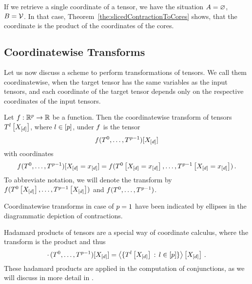If we retrieve a single coordinate of a tensor, we have the situation $A=\varnothing$, $B=\mathcal{V}$.
In that case, Theorem~\ref{the:slicedContractionToCores} shows, that the coordinate is the product of the coordinates of the cores. %

\subsection{Coordinatewise Transforms}

Let us now discuss a scheme to perform transformations of tensors.
We call them coordinatewise, when the target tensor has the same variables as the input tensors, and each coordinate of the target tensor depends only on the respective coordinates of the input tensors. %

\begin{definition}
    \label{def:coordinateCalculus}
    Let $f: \mathbb{R}^{p} \rightarrow \mathbb{R}$ be a function.
    Then the coordinatewise transform of tensors $T^{l}\left[X_{[d]}\right]$, where $l\in[p]$, under $f$ is the tensor
    \[ f(T^{0},\ldots,T^{p-1})[X_{[d]}] \]
    with coordinates
    \[ f(T^{0},\ldots,T^{p-1})[X_{[d]}=x_{[d]}]
    = f(T^{0}\left[X_{[d]}=x_{[d]}\right],\ldots,T^{p-1}\left[X_{[d]}=x_{[d]}\right]) \, .  \]
    To abbreviate notation, we will denote the transform by $f(T^{0}\left[X_{[d]}\right],\ldots,T^{p-1}\left[X_{[d]}\right])$ and $f(T^{0},\ldots,T^{p-1})$.
\end{definition}

Coordinatewise transforms in case of $p=1$ have been indicated by ellipses in the diagrammatic depiction of contractions.

\begin{example}
    Hadamard products of tensors are a special way of coordinate calculus, where the transform is the product and thus
    \[ \cdot \, (T^{0},\ldots,T^{p-1})[X_{[d]}]
    = \left\langle \{T^{l}\left[X_{[d]}\right] \, : \, l\in[p] \}\right\rangle \left[ X_{[d]} \right] \, . \]
    These hadamard products are applied in the computation of conjunctions, as we will discuss in more detail in .
\end{example}

